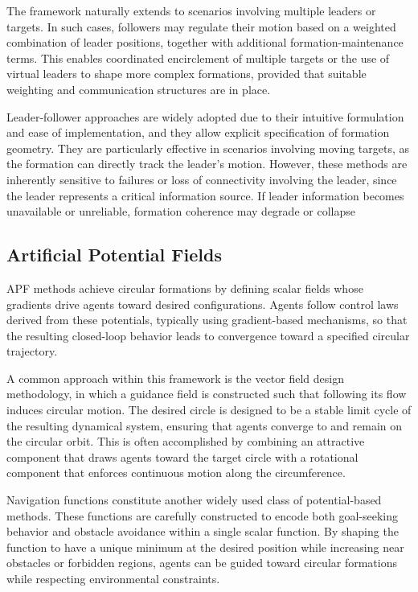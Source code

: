 The framework naturally extends to scenarios involving multiple leaders or targets. In such cases, followers may regulate their motion based on a weighted combination of leader positions, together with additional formation-maintenance terms. This enables coordinated encirclement of multiple targets or the use of virtual leaders to shape more complex formations, provided that suitable weighting and communication structures are in place.

Leader-follower approaches are widely adopted due to their intuitive formulation and ease of implementation, and they allow explicit specification of formation geometry. They are particularly effective in scenarios involving moving targets, as the formation can directly track the leader's motion. However, these methods are inherently sensitive to failures or loss of connectivity involving the leader, since the leader represents a critical information source. If leader information becomes unavailable or unreliable, formation coherence may degrade or collapse

\subsection{Artificial Potential Fields}

\gls{APF} methods \cite{Litimein2021,Zheng2015,5504176} achieve circular formations by defining scalar fields whose gradients drive agents toward desired configurations. Agents follow control laws derived from these potentials, typically using gradient-based mechanisms, so that the resulting closed-loop behavior leads to convergence toward a specified circular trajectory.

A common approach within this framework is the vector field design methodology, in which a guidance field is constructed such that following its flow induces circular motion. The desired circle is designed to be a stable limit cycle of the resulting dynamical system, ensuring that agents converge to and remain on the circular orbit. This is often accomplished by combining an attractive component that draws agents toward the target circle with a rotational component that enforces continuous motion along the circumference.

Navigation functions constitute another widely used class of potential-based methods. These functions are carefully constructed to encode both goal-seeking behavior and obstacle avoidance within a single scalar function. By shaping the function to have a unique minimum at the desired position while increasing near obstacles or forbidden regions, agents can be guided toward circular formations while respecting environmental constraints.

